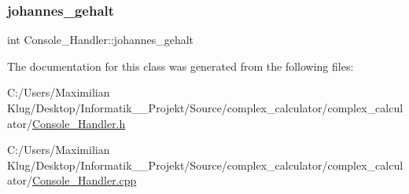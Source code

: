 \subsubsection{\texorpdfstring{johannes\+\_\+gehalt}{johannes\_gehalt}}
{\footnotesize\ttfamily int Console\+\_\+\+Handler\+::johannes\+\_\+gehalt}



The documentation for this class was generated from the following files\+:\begin{DoxyCompactItemize}
\item 
C\+:/\+Users/\+Maximilian Klug/\+Desktop/\+Informatik\+\_\+\_\+\+Projekt/\+Source/complex\+\_\+calculator/complex\+\_\+calculator/\mbox{\hyperlink{_console___handler_8h}{Console\+\_\+\+Handler.\+h}}\item 
C\+:/\+Users/\+Maximilian Klug/\+Desktop/\+Informatik\+\_\+\_\+\+Projekt/\+Source/complex\+\_\+calculator/complex\+\_\+calculator/\mbox{\hyperlink{_console___handler_8cpp}{Console\+\_\+\+Handler.\+cpp}}\end{DoxyCompactItemize}
